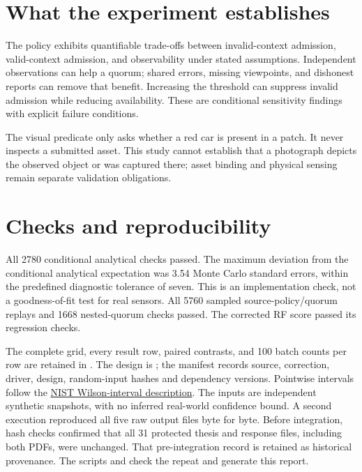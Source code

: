\documentclass[11pt,a4paper]{article}
\begin{document}
\section*{What the experiment establishes}
The policy exhibits quantifiable trade-offs between invalid-context admission, valid-context
admission, and observability under stated assumptions. Independent observations can help a quorum;
shared errors, missing viewpoints, and dishonest reports can remove that benefit. Increasing
the threshold can suppress invalid admission while reducing availability. These are conditional
sensitivity findings with explicit failure conditions.

The visual predicate only asks whether a red car is present in a patch. It never inspects a
submitted asset. This study cannot establish that a photograph depicts the observed object or
was captured there; asset binding and physical sensing remain separate validation obligations.

\section*{Checks and reproducibility}
All 2780 conditional analytical checks passed. The maximum deviation from the
conditional analytical expectation was 3.54 Monte Carlo standard errors, within the predefined
diagnostic tolerance of seven. This is an implementation check, not a goodness-of-fit test for
real sensors. All 5760 sampled source-policy/quorum replays and
1668 nested-quorum checks passed. The corrected RF score passed its regression checks.

The complete grid, every result row, paired contrasts, and 100 batch counts per row are retained
in . The design is ; the manifest records source, correction,
driver, design, random-input hashes and dependency versions. Pointwise intervals follow the
\href{https://www.itl.nist.gov/div898/handbook/prc/section2/prc241.htm}{NIST Wilson-interval description}.
The inputs are independent synthetic snapshots, with no inferred real-world confidence bound.
A second execution reproduced all five raw output files byte for byte. Before integration,
hash checks confirmed that all 31 protected thesis and response files, including both PDFs,
were unchanged. That pre-integration record is retained as historical provenance.
The scripts  and  check the repeat and generate this report.
\end{document}
